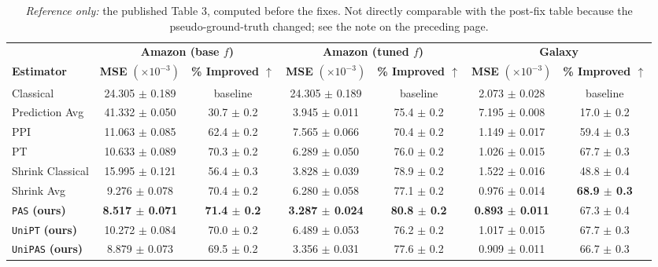 \begin{table}[H]
    \centering
    \caption{\emph{Reference only:} the published Table 3, computed before the fixes. Not directly comparable with the post-fix table because the pseudo-ground-truth changed; see the note on the preceding page.}
    \label{tbl:published_real}
    \vskip 0.05in
    \footnotesize
    \begin{tabular}{lcccccc}
    \toprule
    & \multicolumn{2}{c}{\textbf{Amazon (base $f$)}} & \multicolumn{2}{c}{\textbf{Amazon (tuned $f$)}} & \multicolumn{2}{c}{\textbf{Galaxy}} \\
    \cmidrule(lr){2-3} \cmidrule(lr){4-5} \cmidrule(lr){6-7}
    \textbf{Estimator} & \textbf{MSE} \( (\times 10^{-3}) \) & \textbf{\% Improved $\uparrow$} & \textbf{MSE} \( (\times 10^{-3}) \) & \textbf{\% Improved $\uparrow$} & \textbf{MSE} \( (\times 10^{-3}) \) & \textbf{\% Improved $\uparrow$} \\
    \midrule
    Classical & 24.305 $\pm$ 0.189 & baseline & 24.305 $\pm$ 0.189 & baseline & 2.073 $\pm$ 0.028 & baseline \\
    Prediction Avg & 41.332 $\pm$ 0.050 & 30.7 $\pm$ 0.2 & 3.945 $\pm$ 0.011 & 75.4 $\pm$ 0.2 & 7.195 $\pm$ 0.008 & 17.0 $\pm$ 0.2 \\
    PPI & 11.063 $\pm$ 0.085 & 62.4 $\pm$ 0.2 & 7.565 $\pm$ 0.066 & 70.4 $\pm$ 0.2 & 1.149 $\pm$ 0.017 & 59.4 $\pm$ 0.3 \\
    PT & 10.633 $\pm$ 0.089 & 70.3 $\pm$ 0.2 & 6.289 $\pm$ 0.050 & 76.0 $\pm$ 0.2 & 1.026 $\pm$ 0.015 & 67.7 $\pm$ 0.3 \\
    Shrink Classical & 15.995 $\pm$ 0.121 & 56.4 $\pm$ 0.3 & 3.828 $\pm$ 0.039 & 78.9 $\pm$ 0.2 & 1.522 $\pm$ 0.016 & 48.8 $\pm$ 0.4 \\
    Shrink Avg & 9.276 $\pm$ 0.078 & 70.4 $\pm$ 0.2 & 6.280 $\pm$ 0.058 & 77.1 $\pm$ 0.2 & 0.976 $\pm$ 0.014 & \textbf{68.9 $\pm$ 0.3} \\
    \texttt{PAS} \textbf{(ours)} & \textbf{8.517 $\pm$ 0.071} & \textbf{71.4 $\pm$ 0.2} & \textbf{3.287 $\pm$ 0.024} & \textbf{80.8 $\pm$ 0.2} & \textbf{0.893 $\pm$ 0.011} & 67.3 $\pm$ 0.4 \\
    \texttt{UniPT} \textbf{(ours)} & 10.272 $\pm$ 0.084 & 70.0 $\pm$ 0.2 & 6.489 $\pm$ 0.053 & 76.2 $\pm$ 0.2 & 1.017 $\pm$ 0.015 & 67.7 $\pm$ 0.3 \\
    \texttt{UniPAS} \textbf{(ours)} & 8.879 $\pm$ 0.073 & 69.5 $\pm$ 0.2 & 3.356 $\pm$ 0.031 & 77.6 $\pm$ 0.2 & 0.909 $\pm$ 0.011 & 66.7 $\pm$ 0.3 \\
    \bottomrule
    \end{tabular}
\end{table}

